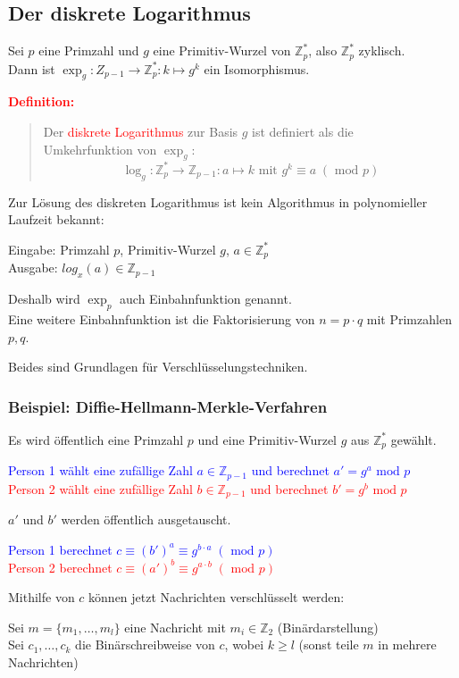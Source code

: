 \documentclass{article}
\newcommand{\red}[1]{\textcolor{red}{#1}}
\newcommand{\blue}[1]{\textcolor{blue}{#1}}
\newcommand{\de}[1]{\red{\textbf{Definition: }}\begin{quote}#1\end{quote}}
\newcommand{\Z}{\mathbb{Z}}
\renewcommand{\mod}{\text{ mod }}
\begin{document}
\subsection{Der diskrete Logarithmus}

Sei $p$ eine Primzahl und $g$ eine Primitiv-Wurzel von $\Z_p^*$, also $\Z_p^*$ zyklisch.\\
Dann ist $\exp_g: Z_{p-1} \to \Z_p^*: k \mapsto g^k$ ein Isomorphismus.

\de{
    Der \red{diskrete Logarithmus} zur Basis $g$ ist definiert als die\\
    Umkehrfunktion von $\exp_g$:
    \[
        \log_g: \Z_p^* \to \Z_{p-1}: a \mapsto k \text{ mit } g^k \equiv a \; (\mod p)
    \]
}

Zur Lösung des diskreten Logarithmus ist kein Algorithmus in polynomieller Laufzeit bekannt:

Eingabe: Primzahl $p$, Primitiv-Wurzel $g$, $a \in \Z_p^*$\\
Ausgabe: $log_x(a) \in \Z_{p-1}$

Deshalb wird $\exp_p$ auch Einbahnfunktion genannt.\\
Eine weitere Einbahnfunktion ist die Faktorisierung von $n = p \cdot q$ mit Primzahlen $p,q$.

Beides sind Grundlagen für Verschlüsselungstechniken.

\subsubsection{Beispiel: Diffie-Hellmann-Merkle-Verfahren}

Es wird öffentlich eine Primzahl $p$ und eine Primitiv-Wurzel $g$ aus $\Z_p^*$ gewählt.

\blue{Person 1 wählt eine zufällige Zahl $a \in \Z_{p-1}$ und berechnet $a' = g^a \mod p$}\\
\red{Person 2 wählt eine zufällige Zahl $b \in \Z_{p-1}$ und berechnet $b' = g^b \mod p$}

$a'$ und $b'$ werden öffentlich ausgetauscht.

\blue{Person 1 berechnet $c \equiv (b')^a \equiv g^{b \cdot a} \;(\mod p)$}\\
\red{Person 2 berechnet $c \equiv (a')^b \equiv g^{a \cdot b} \;(\mod p)$}

Mithilfe von $c$ können jetzt Nachrichten verschlüsselt werden:

Sei $m = \{m_1, \dots, m_l\}$ eine Nachricht mit $m_i \in \Z_2$ (Binärdarstellung)\\
Sei $c_1,\dots,c_k$ die Binärschreibweise von $c$, wobei $k \geq l$ (sonst teile $m$ in mehrere Nachrichten)
\end{document}
